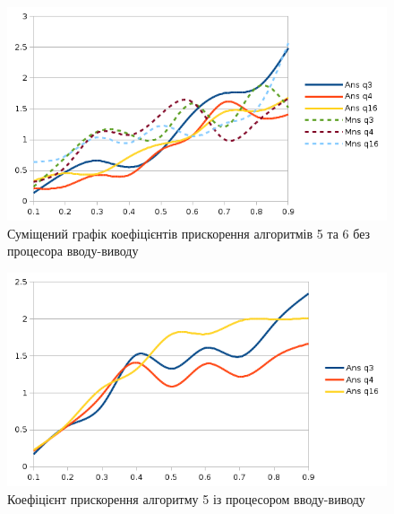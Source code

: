 \begin{figure}[h]
  \begin{center}
    \includegraphics[width=\textwidth]{res/noio_both.png}
  \end{center}
  \caption{Суміщений графік коефіцієнтів прискорення алгоритмів 5 та 6 без процесора вводу-виводу}
\label{fig:noio_both}
\end{figure}

\begin{figure}[h]
  \begin{center}
    \includegraphics[width=\textwidth]{res/io_ans.png}
  \end{center}
  \caption{Коефіцієнт прискорення алгоритму 5 із процесором вводу-виводу}
\label{fig:io_ans}
\end{figure}

